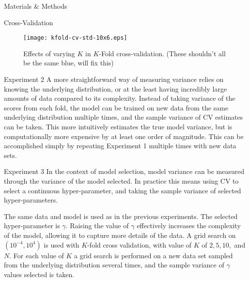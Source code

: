 \documentclass[onecolumn,abstract,letter]{scrartcl}
\begin{document}
\begin{section}{Materials \& Methods}
\begin{subsection}{Cross-Validation}
\begin{figure}[h]
    \centering
    \texttt{[image: kfold-cv-std-10x6.eps]}
    \caption{Effects of varying $K$ in $K$-Fold cross-validation. (These shouldn't all be the same blue, will fix this)}
    \label{fig:kfold-cv}
\end{figure}

\begin{subsubsection}{Experiment 2}
A more straightforward way of measuring variance relies on knowing the underlying distribution, or at the least having incredibly large amounts of data compared to its complexity. 
Instead of taking variance of the scores from each fold, the model can be trained on new data from the same underlying distribution multiple times, and the sample variance of CV estimates can be taken.
This more intuitively estimates the true model variance, but is computationally more expensive by at least one order of magnitude. 
This can be accomplished simply by repeating Experiment 1 multiple times with new data sets. 

\end{subsubsection}

\begin{subsubsection}{Experiment 3}
In the context of model selection, model variance can be measured through the variance of the model selected.
In practice this means using CV to select a continuous hyper-parameter, and taking the sample variance of selected hyper-parameters.

The same data and model is used as in the previous experiments.
The selected hyper-parameter is $\gamma$.
Raising the value of $\gamma$ effectively increases the complexity of the model, allowing it to capture more details of the data.
A grid search on $(10^{-4}, 10^{4})$ is used with $K$-fold cross validation, with value of $K$ of $2,5,10,$ and $N$.
For each value of $K$ a grid search is performed on a new data set sampled from the underlying distribution several times, and the sample variance of $\gamma$ values selected is taken.

\end{subsubsection}

\end{subsection}


\end{section}



\end{document}
